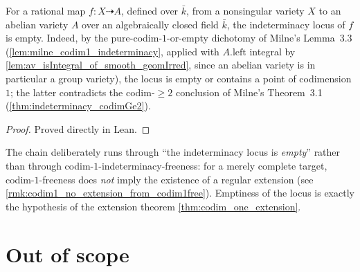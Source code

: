 \begin{lemma}
  \label{lem:av_indeterminacy_empty}
  For a rational map \(f \colon X \dashrightarrow A\), defined over \(\bar k\),
  from a nonsingular variety \(X\) to an abelian variety \(A\) over an
  algebraically closed field \(\bar k\), the indeterminacy locus of \(f\) is
  empty. Indeed, by the pure-codim-\(1\)-or-empty dichotomy of Milne's
  Lemma~3.3 (\cref{lem:milne_codim1_indeterminacy}, applied with
  \(A.\mathrm{left}\) integral by \cref{lem:av_isIntegral_of_smooth_geomIrred},
  since an abelian variety is in particular a group variety), the locus is
  empty or contains a point of codimension \(1\); the latter contradicts the
  codim-\(\geq 2\) conclusion of Milne's Theorem~3.1
  (\cref{thm:indeterminacy_codimGe2}).
  \begin{proof}
    Proved directly in Lean.
  \end{proof}
\end{lemma}

\begin{remark}
  \label{rmk:thm32_why_empty_not_codim1free}
  The chain deliberately runs through ``the indeterminacy locus is
  \emph{empty}'' rather than through codim-\(1\)-indeterminacy-freeness: for a
  merely complete target, codim-\(1\)-freeness does \emph{not} imply the
  existence of a regular extension (see
  \cref{rmk:codim1_no_extension_from_codim1free}). Emptiness of the locus is
  exactly the hypothesis of the extension theorem
  \cref{thm:codim_one_extension}.
\end{remark}

\section{Out of scope}
\label{sec:thm32_out_of_scope}

